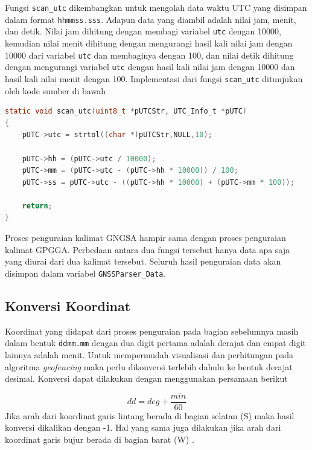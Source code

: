Fungsi \texttt{scan\_utc} dikembangkan untuk mengolah data waktu UTC yang disimpan dalam format \texttt{hhmmss.sss}. Adapun data yang diambil adalah nilai jam, menit, dan detik. Nilai jam dihitung dengan membagi variabel \texttt{utc} dengan 10000, kemudian nilai menit dihitung dengan mengurangi hasil kali nilai jam dengan 10000 dari variabel \texttt{utc} dan membaginya dengan 100, dan nilai detik dihitung dengan mengurangi variabel \texttt{utc} dengan hasil kali nilai jam dengan 10000 dan hasil kali nilai menit dengan 100. Implementasi dari fungsi \texttt{scan\_utc} ditunjukan oleh kode sumber di bawah
\begin{lstlisting}[language=c]
static void scan_utc(uint8_t *pUTCStr, UTC_Info_t *pUTC)
{
	pUTC->utc = strtol((char *)pUTCStr,NULL,10);
	
	pUTC->hh = (pUTC->utc / 10000);
	pUTC->mm = (pUTC->utc - (pUTC->hh * 10000)) / 100;
	pUTC->ss = pUTC->utc - ((pUTC->hh * 10000) + (pUTC->mm * 100));
	
	return;
}
\end{lstlisting}

Proses penguraian kalimat GNGSA hampir sama dengan proses penguraian kalimat GPGGA. Perbedaan antara dua fungsi tersebut hanya data apa saja yang diurai dari dua kalimat tersebut. Seluruh hasil penguraian data akan disimpan dalam variabel \texttt{GNSSParser\_Data}.

\subsection{Konversi Koordinat}
Koordinat yang didapat dari proses penguraian pada bagian sebelumnya masih dalam bentuk \texttt{ddmm.mm} dengan dua digit pertama adalah derajat dan empat digit lainnya adalah menit. Untuk mempermudah visualisasi dan perhitungan pada algoritma \textit{geofencing} maka perlu dikonversi terlebih dahulu ke bentuk derajat desimal. Konversi dapat dilakukan dengan menggunakan persamaan berikut

\begin{equation}
	dd = deg + \frac{min}{60} 
\end{equation}
Jika arah dari koordinat garis lintang berada di bagian selatan (S) maka hasil konversi dikalikan dengan -1. Hal yang sama juga dilakukan jika arah dari koordinat garis bujur berada di bagian barat (W) \cite{AlHindawi2012}.

